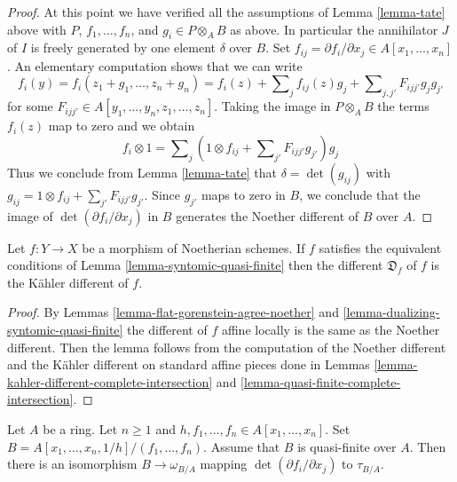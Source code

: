 \begin{proof}
\medskip\noindent
At this point we have verified all the assumptions of Lemma \ref{lemma-tate}
above with $P$, $f_1, \ldots, f_n$, and $g_i \in P \otimes_A B$ as above.
In particular the annihilator $J$ of $I$ is freely generated by one
element $\delta$ over $B$.
Set $f_{ij} = \partial f_i/\partial x_j \in A[x_1, \ldots, x_n]$.
An elementary computation shows that we can write
$$
f_i(y) =
f_i(z_1 + g_1, \ldots, z_n + g_n) =
f_i(z) + \sum\nolimits_j f_{ij}(z) g_j +
\sum\nolimits_{j, j'} F_{ijj'}g_jg_{j'}
$$
for some $F_{ijj'} \in A[y_1, \ldots, y_n, z_1, \ldots, z_n]$.
Taking the image in $P \otimes_A B$ the terms $f_i(z)$ map to
zero and we obtain
$$
f_i \otimes 1 = \sum\nolimits_j
\left(1 \otimes f_{ij} + \sum\nolimits_{j'} F_{ijj'}g_{j'}\right)g_j
$$
Thus we conclude from Lemma \ref{lemma-tate}
that $\delta = \det(g_{ij})$ with
$g_{ij} = 1 \otimes f_{ij} + \sum_{j'} F_{ijj'}g_{j'}$.
Since $g_{j'}$ maps to zero in $B$, we conclude
that the image of $\det(\partial f_i/\partial x_j)$ in $B$
generates the Noether different of $B$ over $A$.
\end{proof}

\begin{lemma}
\label{lemma-different-syntomic-quasi-finite}
Let $f : Y \to X$ be a morphism of Noetherian schemes. If $f$
satisfies the equivalent conditions of Lemma \ref{lemma-syntomic-quasi-finite}
then the different $\mathfrak{D}_f$ of $f$ is the K\"ahler different
of $f$.
\end{lemma}

\begin{proof}
By Lemmas \ref{lemma-flat-gorenstein-agree-noether} and
\ref{lemma-dualizing-syntomic-quasi-finite}
the different of $f$ affine locally is the same as the
Noether different. Then the lemma follows from the
computation of the Noether different and the K\"ahler
different on standard affine pieces done in
Lemmas \ref{lemma-kahler-different-complete-intersection} and
\ref{lemma-quasi-finite-complete-intersection}.
\end{proof}

\begin{lemma}
\label{lemma-different-quasi-finite-complete-intersection}
Let $A$ be a ring. Let $n \geq 1$ and
$h, f_1, \ldots, f_n \in A[x_1, \ldots, x_n]$.
Set $B = A[x_1, \ldots, x_n, 1/h]/(f_1, \ldots, f_n)$.
Assume that $B$ is quasi-finite over $A$.
Then there is an isomorphism $B \to \omega_{B/A}$
mapping $\det(\partial f_i/\partial x_j)$ to $\tau_{B/A}$.
\end{lemma}

